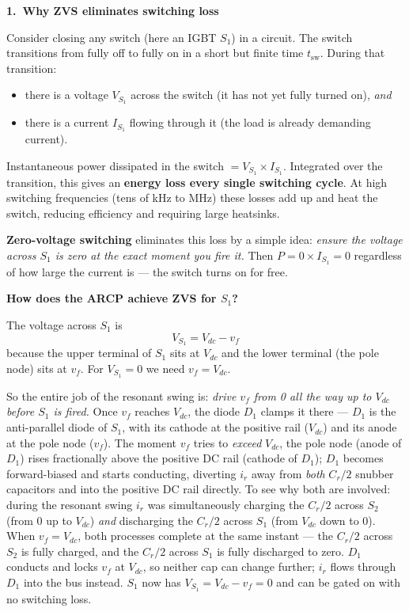\documentclass[12pt, a4paper]{article}
\newcommand{\Vdc}{V_{dc}}
\newcommand{\vf}{v_f}
\newcommand{\ir}{i_r}
\newcommand{\Cr}{C_r}
\begin{document}
\begin{physbox}
\textbf{1.\ Why ZVS eliminates switching loss}

Consider closing any switch (here an IGBT $S_1$) in a circuit.
The switch transitions from fully off to fully on in a short but finite time
$t_\text{sw}$.  During that transition:
\begin{itemize}
    \item there is a voltage $V_{S_1}$ across the switch (it has not yet
          fully turned on), \emph{and}
    \item there is a current $I_{S_1}$ flowing through it (the load is
          already demanding current).
\end{itemize}
Instantaneous power dissipated in the switch $= V_{S_1} \times I_{S_1}$.
Integrated over the transition, this gives an \textbf{energy loss every
single switching cycle}.  At high switching frequencies (tens of kHz to MHz)
these losses add up and heat the switch, reducing efficiency and requiring
large heatsinks.

\textbf{Zero-voltage switching} eliminates this loss by a simple idea:
\emph{ensure the voltage across $S_1$ is zero at the exact moment you
fire it.}  Then $P = 0 \times I_{S_1} = 0$ regardless of how large the
current is — the switch turns on for free.

\medskip
\textbf{How does the ARCP achieve ZVS for $S_1$?}

The voltage across $S_1$ is
\begin{equation*}
    V_{S_1} = \Vdc - \vf
\end{equation*}
because the upper terminal of $S_1$ sits at $\Vdc$ and the lower terminal
(the pole node) sits at $\vf$.  For $V_{S_1} = 0$ we need
$\vf = \Vdc$.

So the entire job of the resonant swing is:
\emph{drive $\vf$ from 0 all the way up to $\Vdc$ before $S_1$ is fired.}
Once $\vf$ reaches $\Vdc$, the diode $D_1$ clamps it there — $D_1$ is the
anti-parallel diode of $S_1$, with its cathode at the positive rail ($\Vdc$)
and its anode at the pole node ($\vf$).
The moment $\vf$ tries to \emph{exceed} $\Vdc$, the pole node (anode of
$D_1$) rises fractionally above the positive DC rail (cathode of $D_1$);
$D_1$ becomes forward-biased and starts conducting, diverting $\ir$ away
from \emph{both} $\Cr/2$ snubber capacitors and into the positive DC rail
directly.
To see why both are involved: during the resonant swing $\ir$ was
simultaneously charging the $\Cr/2$ across $S_2$ (from 0 up to $\Vdc$)
\emph{and} discharging the $\Cr/2$ across $S_1$ (from $\Vdc$ down to 0).
When $\vf = \Vdc$, both processes complete at the same instant —
the $\Cr/2$ across $S_2$ is fully charged, and the $\Cr/2$ across $S_1$
is fully discharged to zero.
$D_1$ conducts and locks $\vf$ at $\Vdc$, so neither cap can change
further; $\ir$ flows through $D_1$ into the bus instead.
$S_1$ now has $V_{S_1} = \Vdc - \vf = 0$ and can be gated on with no
switching loss.


\end{physbox}
\end{document}
